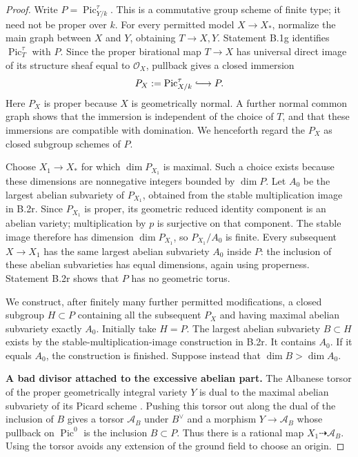 \begin{proof}
Write $P=\operatorname{Pic}^{\tau}_{Y/k}$.  This is a commutative
group scheme of finite type; it need not be proper over $k$.
For every permitted model $X\to X_*$, normalize the main graph
between $X$ and $Y$, obtaining $T\to X,Y$.  Statement B.1g
identifies $\operatorname{Pic}^{\tau}_T$ with $P$.
Since the proper birational map $T\to X$ has universal direct
image of its structure sheaf equal to $\mathcal O_X$, pullback
gives a closed immersion
\[
                       P_X:=\operatorname{Pic}^{\tau}_{X/k}
                              \lhook\joinrel\longrightarrow P.
\]
Here $P_X$ is proper because $X$ is geometrically normal.
A further normal common graph shows that the immersion is
independent of the choice of $T$, and that these immersions are
compatible with domination.  We henceforth regard the $P_X$ as
closed subgroup schemes of $P$.

Choose $X_1\to X_*$ for which $\dim P_{X_1}$ is maximal.
Such a choice exists because these dimensions are nonnegative
integers bounded by $\dim P$.  Let $A_0$ be the largest abelian
subvariety of $P_{X_1}$, obtained from the stable multiplication
image in B.2r.  Since $P_{X_1}$ is proper, its geometric reduced
identity component is an abelian variety; multiplication by $p$
is surjective on that component.  The stable image therefore
has dimension $\dim P_{X_1}$, so $P_{X_1}/A_0$ is finite.
Every subsequent $X\to X_1$ has the same largest abelian
subvariety $A_0$ inside $P$: the inclusion of these abelian
subvarieties has equal dimensions, again using properness.
Statement B.2r shows that $P$ has no geometric torus.

We construct, after finitely many further permitted modifications,
a closed subgroup $H\subset P$ containing all the subsequent
$P_X$ and having maximal abelian subvariety exactly $A_0$.
Initially take $H=P$.  The largest abelian subvariety $B\subset H$
exists by the stable-multiplication-image construction in B.2r.
It contains $A_0$.  If it equals $A_0$, the construction is finished.
Suppose instead that $\dim B>\dim A_0$.

\par\smallskip\noindent\textbf{A bad divisor attached to the excessive abelian part.}\quad
The Albanese torsor of the proper geometrically integral variety
$Y$ is dual to the maximal abelian subvariety of its Picard
scheme \cite[Theorem 3.2 and Remark 3.3, pp.~12--13 of the
author manuscript]{C_ACMV2026}.  Pushing this torsor out along
the dual of the inclusion of $B$ gives a torsor $\mathcal A_B$
under $B^\vee$ and a morphism $Y\to\mathcal A_B$ whose pullback
on $\operatorname{Pic}^0$ is the inclusion $B\subset P$.
Thus there is a rational map $X_1\dashrightarrow\mathcal A_B$.
Using the torsor avoids any extension of the ground field to
choose an origin.


\end{proof}
